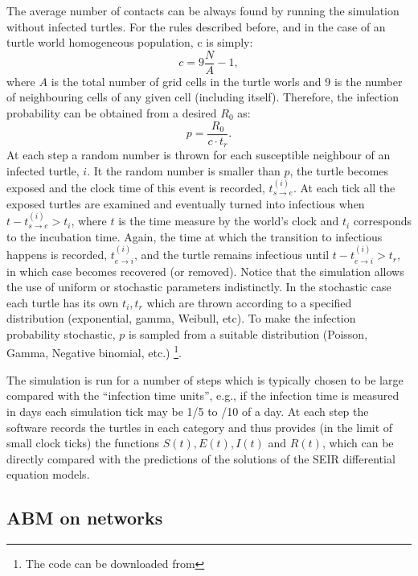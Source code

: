 \documentclass[a4paper,oneside,11pt]{article}
\begin{document}
The average number of contacts can be always found by running the simulation without infected turtles. For the rules described before, and in the case of an turtle world homogeneous population, c is simply:
\begin{equation}
c = 9 \frac{N}{A}-1,
\end{equation}
%
where $A$ is the total number of grid cells in the turtle worls and 9 is the number of  neighbouring cells of any given cell (including itself). Therefore, the infection probability can be obtained from a desired $R_0$  as:
\begin{equation}
p = \frac{R_0}{c \cdot t_r}.
\end{equation}
At each step a random number is thrown for each susceptible neighbour of an infected turtle, $i$. It the random number is smaller than $p$, the turtle becomes exposed and the clock time of this event is recorded, $t_{s\rightarrow e}^{(i)}$. At each tick all the exposed turtles are examined and eventually turned into infectious when 
$t - t^{(i)}_{s\rightarrow e} > t_i$, where $t$ is the time measure by the world's clock and $t_i$ corresponds to the incubation time. Again, the time at which the transition to infectious happens is recorded, $t^{(i)}_{e\rightarrow i}$, and the turtle remains infectious until $t - t^{(i)}_{e\rightarrow i} > t_r$, in which case becomes recovered (or removed).
Notice that the simulation allows the use of uniform or stochastic parameters indistinctly. In the stochastic case each turtle has its own $t_i, t_r$ which are thrown according to a specified distribution (exponential, gamma, Weibull, etc). To make the infection probability stochastic, $p$ is sampled from a suitable distribution (Poisson, Gamma, Negative binomial, etc.) \footnote{The code can be downloaded from }.

The simulation is run for a number of steps which is typically chosen to be large compared with the ``infection time units'', e.g., if the infection time is measured in days each simulation tick may be 1/5 to /10 of a day. At each step the software records the turtles in each category and thus provides (in the limit of small clock ticks) the functions $S(t), E(t), I(t)$ and $R(t)$, which can be directly compared with the predictions of the solutions of the SEIR differential equation models.

\subsection{ABM on networks}
\end{document}
